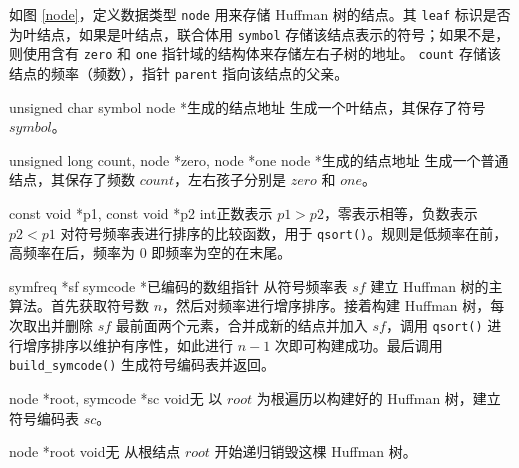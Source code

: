 如图 \ref{node}，定义数据类型 \verb|node| 用来存储 Huffman 树的结点。其 \verb|leaf| 标识是否为叶结点，如果是叶结点，联合体用 \verb|symbol| 存储该结点表示的符号；如果不是，则使用含有 \verb|zero| 和 \verb|one| 指针域的结构体来存储左右子树的地址。
 \verb|count| 存储该结点的频率（频数），指针 \verb|parent| 指向该结点的父亲。

{unsigned char symbol}
{node *}{生成的结点地址}
{生成一个叶结点，其保存了符号 $symbol$。}

{unsigned long count, node *zero, node *one}
{node *}{生成的结点地址}
{生成一个普通结点，其保存了频数 $count$，左右孩子分别是 $zero$ 和 $one$。}

{const void *p1, const void *p2}
{int}{正数表示 $p1 > p2$，零表示相等，负数表示 $p2<p1$}
{对符号频率表进行排序的比较函数，用于 {\tt qsort()}。规则是低频率在前，高频率在后，频率为 0 即频率为空的在末尾。}

{symfreq *sf}
{symcode *}{已编码的数组指针}
{从符号频率表 $sf$ 建立 Huffman 树的主算法。首先获取符号数 $n$，然后对频率进行增序排序。接着构建 Huffman 树，每次取出并删除 $sf$ 最前面两个元素，合并成新的结点并加入 $sf$，调用 {\tt qsort()} 进行增序排序以维护有序性，如此进行 $n-1$ 次即可构建成功。最后调用 {\tt build\_symcode()} 生成符号编码表并返回。}

{node *root, symcode *sc}
{void}{无}
{以 $root$ 为根遍历以构建好的 Huffman 树，建立符号编码表 $sc$。}

{node *root}
{void}{无}
{从根结点 $root$ 开始递归销毁这棵 Huffman 树。}
